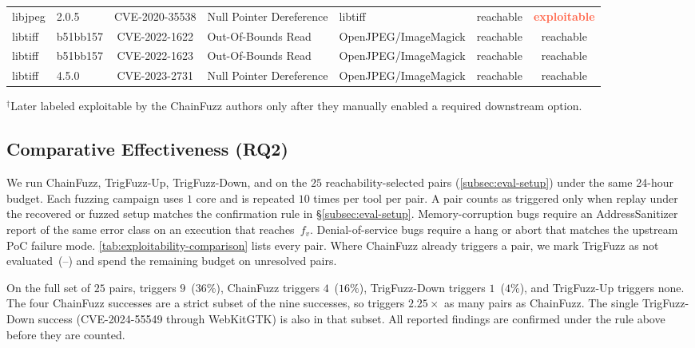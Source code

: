 \begin{table}[t]
\begin{tabular}{llcll||c|c}
libjpeg
& 2.0.5
& CVE-2020-35538
& Null Pointer Dereference
& libtiff
& reachable
& \textcolor{tomato}{\textbf{exploitable}} \\

libtiff
& b51bb157
& CVE-2022-1622
& Out-Of-Bounds Read
& OpenJPEG/ImageMagick
& reachable
& reachable \\

libtiff
& b51bb157
& CVE-2022-1623
& Out-Of-Bounds Read
& OpenJPEG/ImageMagick
& reachable
& reachable  \\

libtiff
& 4.5.0
& CVE-2023-2731
& Null Pointer Dereference
& OpenJPEG/ImageMagick
& reachable
& reachable  \\

\hline
\end{tabular}

\vspace{4pt}
\begin{minipage}{\textwidth}
\footnotesize\raggedright
$^{\dag}$Later labeled exploitable by the ChainFuzz authors only after they manually enabled a required downstream option.
\end{minipage}
\end{table}


\subsection{Comparative Effectiveness (RQ2)}
\label{subsec:rq2}
We run ChainFuzz, TrigFuzz-Up, TrigFuzz-Down, and \sys on the $25$ reachability-selected pairs (\autoref{subsec:eval-setup}) under the same 24-hour budget.
Each fuzzing campaign uses $1$ core and is repeated $10$ times per tool per pair.
A pair counts as triggered only when replay under the recovered or fuzzed setup matches the confirmation rule in \S\ref{subsec:eval-setup}.
Memory-corruption bugs require an AddressSanitizer report of the same error class on an execution that reaches~$f_v$.
Denial-of-service bugs require a hang or abort that matches the upstream PoC failure mode.
\autoref{tab:exploitability-comparison} lists every pair.
Where ChainFuzz already triggers a pair, we mark TrigFuzz as not evaluated~({--}) and spend the remaining budget on unresolved pairs.

On the full set of $25$ pairs, \sys triggers $9$~($36\%$), ChainFuzz triggers $4$~($16\%$), TrigFuzz-Down triggers $1$~($4\%$), and TrigFuzz-Up triggers none.
The four ChainFuzz successes are a strict subset of the nine \sys successes, so \sys triggers $2.25\times$ as many pairs as ChainFuzz.
The single TrigFuzz-Down success (CVE-2024-55549 through WebKitGTK) is also in that subset.
All reported findings are confirmed under the rule above before they are counted.

